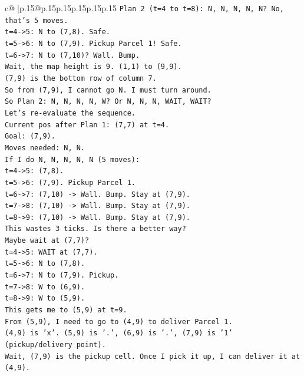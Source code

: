 \documentclass{article}
\begin{document}
{\begin{supertabular}{c@{$\;$}|p{.15\linewidth}@{}p{.15\linewidth}p{.15\linewidth}p{.15\linewidth}p{.15\linewidth}p{.15\linewidth}}
{{{\texttt{Plan 2 (t=4 to t=8): N, N, N, N, N? No, that's 5 moves.} \\
\texttt{t=4{-}>5: N to (7,8). Safe.} \\
\texttt{t=5{-}>6: N to (7,9). Pickup Parcel 1! Safe.} \\
\texttt{t=6{-}>7: N to (7,10)? Wall. Bump.} \\
\texttt{Wait, the map height is 9. (1,1) to (9,9).} \\
\texttt{(7,9) is the bottom row of column 7.} \\
\texttt{So from (7,9), I cannot go N. I must turn around.} \\
\texttt{So Plan 2: N, N, N, N, W? Or N, N, N, WAIT, WAIT?} \\
\texttt{Let's re{-}evaluate the sequence.} \\
\texttt{Current pos after Plan 1: (7,7) at t=4.} \\
\texttt{Goal: (7,9).} \\
\texttt{Moves needed: N, N.} \\
\texttt{If I do N, N, N, N, N (5 moves):} \\
\texttt{t=4{-}>5: (7,8).} \\
\texttt{t=5{-}>6: (7,9). Pickup Parcel 1.} \\
\texttt{t=6{-}>7: (7,10) {-}> Wall. Bump. Stay at (7,9).} \\
\texttt{t=7{-}>8: (7,10) {-}> Wall. Bump. Stay at (7,9).} \\
\texttt{t=8{-}>9: (7,10) {-}> Wall. Bump. Stay at (7,9).} \\
\texttt{This wastes 3 ticks. Is there a better way?} \\
\texttt{Maybe wait at (7,7)?} \\
\texttt{t=4{-}>5: WAIT at (7,7).} \\
\texttt{t=5{-}>6: N to (7,8).} \\
\texttt{t=6{-}>7: N to (7,9). Pickup.} \\
\texttt{t=7{-}>8: W to (6,9).} \\
\texttt{t=8{-}>9: W to (5,9).} \\
\texttt{This gets me to (5,9) at t=9.} \\
\texttt{From (5,9), I need to go to (4,9) to deliver Parcel 1.} \\
\texttt{(4,9) is 'x'. (5,9) is '.', (6,9) is '.', (7,9) is '1' (pickup/delivery point).} \\
\texttt{Wait, (7,9) is the pickup cell. Once I pick it up, I can deliver it at (4,9).} \\
}}}
\end{supertabular}}
\end{document}
